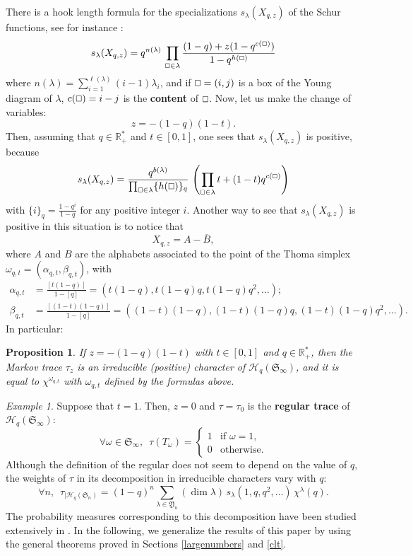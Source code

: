\documentclass[smallextended,nospthms]{svjour3}
\newtheorem{proposition}[theorem]{Proposition}
\theoremstyle{remark}
\newtheorem*{example}{Example}
\newcommand{\R}{\mathbb{R}}
\newcommand{\hecke}{\mathscr{H}}
\newcommand{\sym}{\mathfrak{S}}
\newcommand{\ym}{\mathfrak{Y}}
\begin{document}
There is a hook length formula for the specializations $s_{\lambda}(X_{q,z})$ of the Schur functions, see for instance \cite[\S1.3]{Mac95}:
$$s_{\lambda}(X_{q,z})=q^{n(\lambda)}\,\prod_{\oblong \in \lambda} \frac{(1-q)+z(1-q^{c(\oblong)})}{1-q^{h(\oblong)}}
$$
where $n(\lambda)=\sum_{i=1}^{\ell(\lambda)}(i-1)\lambda_{i}$, and if $\oblong =(i,j)$ is a box of the Young diagram of $\lambda$, $c(\oblong)=i-j$ is the \textbf{content} of $\oblong$. Now, let us make the change of variables:
$$
z=-(1-q)(1-t).
$$
Then, assuming that $q \in \R_{+}^{*}$ and $t \in [0,1]$, one sees that $s_{\lambda}(X_{q,z})$ is positive, because
$$
s_{\lambda}(X_{q,z})=\frac{q^{b(\lambda)}}{\prod_{\oblong \in \lambda} \{h(\oblong)\}_{q}}\,\left(\prod_{\oblong \in \lambda} t+(1-t)q^{c(\oblong)}\right)
$$
with $\{i\}_{q}=\frac{1-q^{i}}{1-q}$ for any positive integer $i$. Another way to see that $s_{\lambda}(X_{q,z})$ is positive in this situation is to notice that $$X_{q,z}=A-\overline{B},$$ where $A$ and $B$ are the alphabets associated to the point of the Thoma simplex $\omega_{q,t}=(\alpha_{q,t},\beta_{q,t}) $, with
\begin{align*}
\alpha_{q,t} &= \frac{[t(1-q)]}{1-[q]} = (t(1-q),t(1-q)q,t(1-q)q^{2},\ldots);\\
\beta_{q,t} &= \frac{[(1-t)(1-q)]}{1-[q]} = ((1-t)(1-q),(1-t)(1-q)q,(1-t)(1-q)q^{2},\ldots).
\end{align*}
In particular:
\begin{proposition}
If $z=-(1-q)(1-t)$ with $t \in [0,1]$ and $q \in \R_{+}^{*}$, then the Markov trace $\tau_{z}$ is an irreducible (positive) character of $\hecke_{q}(\sym_{\infty})$, and it is equal to $\chi^{\omega_{q,t}}$ with $\omega_{q,t}$ defined by the formulas above.
\end{proposition}

\begin{example}
Suppose that $t=1$. Then, $z=0$ and $\tau=\tau_{0}$ is the \textbf{regular trace} of $\hecke_{q}(\sym_{\infty})$:
$$\forall \omega \in \sym_{\infty},\,\,\,\tau(T_\omega)=\begin{cases}
1 & \text{if }\omega=1,\\
0 & \text{otherwise}.
\end{cases}
$$
Although the definition of the regular does not seem to depend on the value of $q$, the weights of $\tau$ in its decomposition in irreducible characters vary with $q$:
$$\forall n,\,\,\,\tau_{|\hecke_{q}(\sym_{n})}=(1-q)^{n}\sum_{\lambda \in \ym_{n}} (\dim \lambda)\,s_{\lambda}(1,q,q^{2},\ldots)\,\chi^{\lambda}(q).$$
The probability measures corresponding to this decomposition have been studied extensively in \cite{FM10}. In the following, we generalize the results of this paper by using the general theorems proved in Sections \ref{largenumbers} and \ref{clt}.
\end{example}
\end{document}
